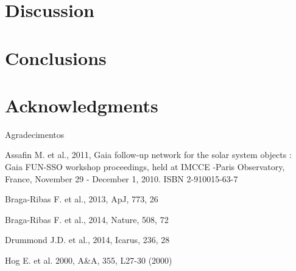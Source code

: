 \documentclass[useAMS,usenatbib]{mn2e}
\begin{document}
\section[]{Discussion}






\section{Conclusions}



\section*{Acknowledgments}

Agradecimentos


\begin{thebibliography}{99}

 Assafin M. et al., 2011, Gaia follow-up network for the solar system objects : Gaia FUN-SSO workshop proceedings, held at IMCCE -Paris Observatory, France, November 29 - December 1, 2010. ISBN 2-910015-63-7


 Braga-Ribas F. et al., 2013,
ApJ, 773, 26

 Braga-Ribas F. et al., 2014,
Nature, 508, 72

 Drummond J.D. et al., 2014,
Icarus, 236, 28

 Hog E. et al. 2000, A\&A, 355, L27-30 (2000)


\end{thebibliography}
\end{document}
